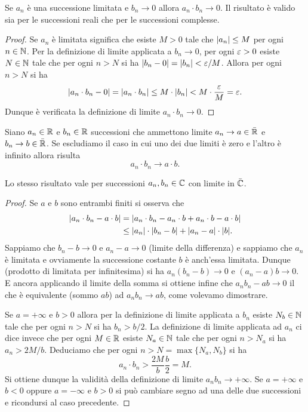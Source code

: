 \begin{theorem}
\mymark{**}
Se $a_n$ è una successione limitata e $b_n\to 0$ allora
$a_n\cdot b_n \to 0$.
Il risultato è valido sia per le successioni reali
che per le successioni complesse.
\end{theorem}
%
\begin{proof}
  Se $a_n$ è limitata significa che esiste $M>0$ tale che ${\left|a_n\right|}\le M$ per
  ogni $n\in \mathbb N$.
  Per la definizione di limite applicata a $b_n\to 0$, per ogni $\varepsilon>0$
  esiste $N\in \mathbb N$ tale che per ogni $n>N$ si ha ${\left|b_n -0\right|}={\left|b_n\right|} < \varepsilon / M$.
  Allora per ogni $n>N$ si ha
  \[
    {\left|a_n\cdot b_n - 0\right|} = {\left|a_n\cdot b_n\right|} \le M \cdot {\left|b_n\right|}
    < M \cdot \frac {\varepsilon} M = \varepsilon.
  \]
  Dunque è verificata la definizione di limite $a_n \cdot b_n \to 0$.
\end{proof}
\begin{theorem}
\label{th:limite_prodotto}
\mymark{***}
Siano $a_n\in \mathbb R$ e $b_n\in \mathbb R$ successioni
che ammettono limite $a_n \to a\in \bar {\mathbb R}$ e $b_n \to b\in \bar {\mathbb R}$.
Se escludiamo il caso in cui uno dei due limiti
è zero e l'altro è infinito
allora risulta
\[
  a_n \cdot b_n \to a\cdot b.
\]

Lo stesso risultato vale per successioni $a_n,b_n\in \mathbb C$ con limite in $\bar {\mathbb C}$.
\end{theorem}
\begin{proof}
\mymark{**}
Se $a$ e $b$ sono entrambi finiti si osserva che
\begin{align*}
  {\left|a_n \cdot b_n - a\cdot b\right|}
  &= {\left|a_n \cdot b_n - a_n \cdot b + a_n \cdot b - a\cdot b\right|}\\
  &\le {\left|a_n\right|} \cdot{\left|b_n - b\right|} + {\left|a_n -a\right|} \cdot {\left|b\right|}.
\end{align*}
Sappiamo che $b_n - b \to 0$ e $a_n - a \to 0$ (limite della differenza)
e sappiamo che $a_n$ è limitata e ovviamente la successione costante $b$ è anch'essa limitata.
Dunque (prodotto di limitata per infinitesima) si ha $a_n(b_n-b)\to 0$ e $(a_n-a)b\to 0$. E ancora applicando il limite della somma si ottiene
infine che $a_n b_n - ab\to 0$ il che è equivalente (sommo $ab$) ad $a_n b_n\to ab$, come volevamo dimostrare.

Se $a = +\infty$ e $b>0$ allora per la definizione di limite applicata a $b_n$
esiste $N_b\in \mathbb N$ tale che per ogni $n>N$ si ha $b_n > b/2$. La definizione
di limite applicata ad $a_n$ ci dice invece che per ogni $M\in \mathbb R$
esiste $N_a\in \mathbb N$ tale che per ogni $n>N_a$ si ha $a_n > 2M/b$.
Deduciamo che per ogni $n> N=\max\{N_a, N_b\}$ si ha
\[
  a_n\cdot b_n > \frac{2M}{b}\frac{b}{2} = M.
\]
Si ottiene dunque la validità della definizione di limite $a_n b_n\to +\infty$.
Se $a= +\infty$ e $b<0$ oppure $a=-\infty$ e $b>0$ si può cambiare segno
ad una delle due successioni e ricondursi al caso precedente.
\end{proof}

